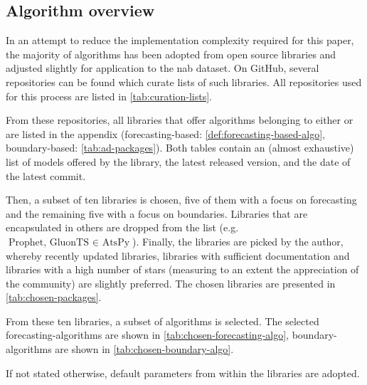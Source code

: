 \subsection{Algorithm overview}
In an attempt to reduce the implementation complexity required for this paper,
the majority of algorithms has been adopted from open source libraries and
adjusted slightly for application to the \gls{nab} dataset. On GitHub, several
repositories can be found which curate lists of such libraries. All repositories
used for this process are listed in \cref{tab:curation-lists}.

From these repositories, all libraries that offer algorithms belonging to either
 or 
are listed in the appendix (forecasting-based: \cref{def:forecasting-based-algo},
boundary-based: \cref{tab:ad-packages}). Both tables contain an (almost exhaustive)
list of models offered by the library, the latest released version, and the date
of the latest commit.

Then, a subset of ten libraries is chosen, five of them with a focus on forecasting
and the remaining five with a focus on boundaries. Libraries that are encapsulated
in others are dropped from the list (e.g.\ \(\text{Prophet, GluonTS } \in \text{ AtsPy}\)).
Finally, the libraries are picked by the author, whereby recently updated libraries,
libraries with sufficient documentation and libraries with a high number of
stars (measuring to an extent the appreciation of the community) are slightly
preferred. The chosen libraries are presented in \cref{tab:chosen-packages}.

From these ten libraries, a subset of algorithms is selected. The selected
forecasting-algorithms are shown in \cref{tab:chosen-forecasting-algo},
boundary-algorithms are shown in \cref{tab:chosen-boundary-algo}.

If not stated otherwise, default parameters from within the libraries are adopted.
